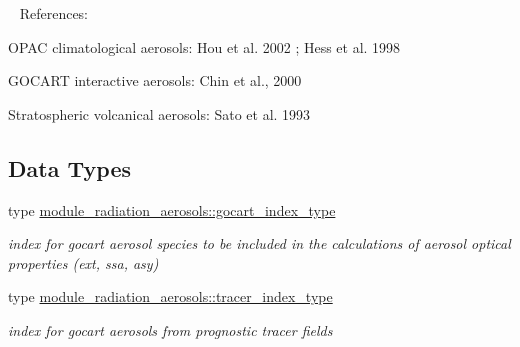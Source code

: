 ~\newline
 References\+:
\begin{DoxyItemize}
\item O\+P\+AC climatological aerosols\+: Hou et al. 2002 \cite{hou_et_al_2002}; Hess et al. 1998 \cite{hess_et_al_1998}
\item G\+O\+C\+A\+RT interactive aerosols\+: Chin et al., 2000 \cite{chin_et_al_2000}
\item Stratospheric volcanical aerosols\+: Sato et al. 1993 \cite{sato_et_al_1993} 
\end{DoxyItemize}\subsection*{Data Types}
\begin{DoxyCompactItemize}
\item 
type \hyperlink{structmodule__radiation__aerosols_1_1gocart__index__type}{module\+\_\+radiation\+\_\+aerosols\+::gocart\+\_\+index\+\_\+type}
\begin{DoxyCompactList}\small\item\em index for gocart aerosol species to be included in the calculations of aerosol optical properties (ext, ssa, asy) \end{DoxyCompactList}\item 
type \hyperlink{structmodule__radiation__aerosols_1_1tracer__index__type}{module\+\_\+radiation\+\_\+aerosols\+::tracer\+\_\+index\+\_\+type}
\begin{DoxyCompactList}\small\item\em index for gocart aerosols from prognostic tracer fields \end{DoxyCompactList}\end{DoxyCompactItemize}
